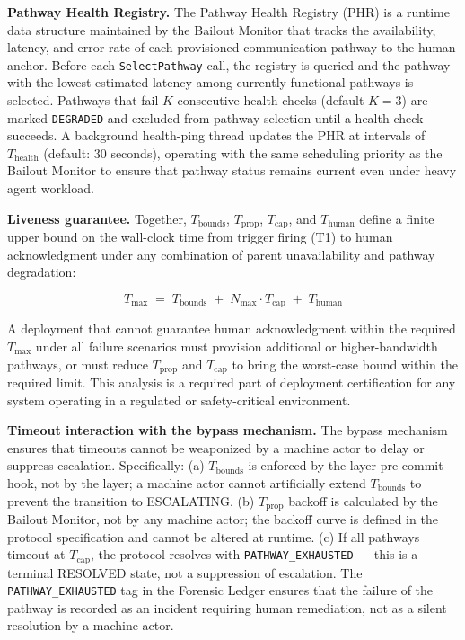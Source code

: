 \bigskip
\noindent\textbf{Pathway Health Registry.} The Pathway Health Registry (PHR) is a runtime data structure maintained by the Bailout Monitor that tracks the availability, latency, and error rate of each provisioned communication pathway to the human anchor. Before each \texttt{SelectPathway} call, the registry is queried and the pathway with the lowest estimated latency among currently functional pathways is selected. Pathways that fail $K$ consecutive health checks (default $K = 3$) are marked \texttt{DEGRADED} and excluded from pathway selection until a health check succeeds. A background health-ping thread updates the PHR at intervals of $T_{\text{health}}$ (default: 30 seconds), operating with the same scheduling priority as the Bailout Monitor to ensure that pathway status remains current even under heavy agent workload.

\bigskip
\noindent\textbf{Liveness guarantee.} Together, $T_{\text{bounds}}$, $T_{\text{prop}}$, $T_{\text{cap}}$, and $T_{\text{human}}$ define a finite upper bound on the wall-clock time from trigger firing (T1) to human acknowledgment under any combination of parent unavailability and pathway degradation:

\begin{equation}
T_{\max} \;=\; T_{\text{bounds}} \;+\; N_{\max} \cdot T_{\text{cap}} \;+\; T_{\text{human}} \tag{T-max}
\end{equation}

A deployment that cannot guarantee human acknowledgment within the required $T_{\max}$ under all failure scenarios must provision additional or higher-bandwidth pathways, or must reduce $T_{\text{prop}}$ and $T_{\text{cap}}$ to bring the worst-case bound within the required limit. This analysis is a required part of deployment certification for any \bxthree{} system operating in a regulated or safety-critical environment.

\bigskip
\noindent\textbf{Timeout interaction with the bypass mechanism.} The bypass mechanism ensures that timeouts cannot be weaponized by a machine actor to delay or suppress escalation. Specifically: (a) $T_{\text{bounds}}$ is enforced by the \fact{} layer pre-commit hook, not by the \bounds{} layer; a machine actor cannot artificially extend $T_{\text{bounds}}$ to prevent the transition to ESCALATING. (b) $T_{\text{prop}}$ backoff is calculated by the Bailout Monitor, not by any machine actor; the backoff curve is defined in the protocol specification and cannot be altered at runtime. (c) If all pathways timeout at $T_{\text{cap}}$, the protocol resolves with \texttt{PATHWAY\_EXHAUSTED} — this is a terminal RESOLVED state, not a suppression of escalation. The \texttt{PATHWAY\_EXHAUSTED} tag in the Forensic Ledger ensures that the failure of the pathway is recorded as an incident requiring human remediation, not as a silent resolution by a machine actor.